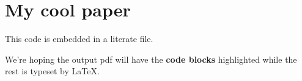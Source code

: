\documentclass{article}
\begin{document}
\section{My cool paper}

This code is embedded in a literate file.

\begin{code}
\KatlaSpace{}\KatlaNewline{}
\KatlaNewline{}
\KatlaSpace{}\KatlaNewline{}
\KatlaNewline{}
\KatlaNewline{}
\KatlaSpace{}\IdrisKeyword{:}\KatlaSpace{}\KatlaSpace{}\IdrisType{()}\KatlaNewline{}
\KatlaSpace{}\IdrisKeyword{=}\KatlaSpace{}\KatlaSpace{}\KatlaNewline{}
\end{code}

We're hoping the output pdf will have the \textbf{code blocks} highlighted
while the rest is typeset by \LaTeX{}.
\end{document}
